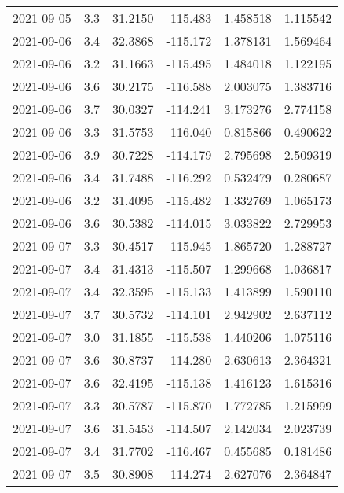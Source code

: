 \begin{tabular}{lrrrrr}
2021-09-05 &       3.3 &  31.2150 &  -115.483 &         1.458518 &         1.115542 \\
2021-09-06 &       3.4 &  32.3868 &  -115.172 &         1.378131 &         1.569464 \\
2021-09-06 &       3.2 &  31.1663 &  -115.495 &         1.484018 &         1.122195 \\
2021-09-06 &       3.6 &  30.2175 &  -116.588 &         2.003075 &         1.383716 \\
2021-09-06 &       3.7 &  30.0327 &  -114.241 &         3.173276 &         2.774158 \\
2021-09-06 &       3.3 &  31.5753 &  -116.040 &         0.815866 &         0.490622 \\
2021-09-06 &       3.9 &  30.7228 &  -114.179 &         2.795698 &         2.509319 \\
2021-09-06 &       3.4 &  31.7488 &  -116.292 &         0.532479 &         0.280687 \\
2021-09-06 &       3.2 &  31.4095 &  -115.482 &         1.332769 &         1.065173 \\
2021-09-06 &       3.6 &  30.5382 &  -114.015 &         3.033822 &         2.729953 \\
2021-09-07 &       3.3 &  30.4517 &  -115.945 &         1.865720 &         1.288727 \\
2021-09-07 &       3.4 &  31.4313 &  -115.507 &         1.299668 &         1.036817 \\
2021-09-07 &       3.4 &  32.3595 &  -115.133 &         1.413899 &         1.590110 \\
2021-09-07 &       3.7 &  30.5732 &  -114.101 &         2.942902 &         2.637112 \\
2021-09-07 &       3.0 &  31.1855 &  -115.538 &         1.440206 &         1.075116 \\
2021-09-07 &       3.6 &  30.8737 &  -114.280 &         2.630613 &         2.364321 \\
2021-09-07 &       3.6 &  32.4195 &  -115.138 &         1.416123 &         1.615316 \\
2021-09-07 &       3.3 &  30.5787 &  -115.870 &         1.772785 &         1.215999 \\
2021-09-07 &       3.6 &  31.5453 &  -114.507 &         2.142034 &         2.023739 \\
2021-09-07 &       3.4 &  31.7702 &  -116.467 &         0.455685 &         0.181486 \\
2021-09-07 &       3.5 &  30.8908 &  -114.274 &         2.627076 &         2.364847 \\

\end{tabular}
